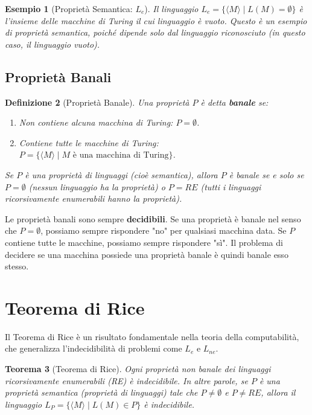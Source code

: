 \documentclass[a4paper, 11pt]{book} %
\newtheorem{theorem}{Teorema}[section]
\newtheorem{definition}[theorem]{Definizione}
\newtheorem{example}[theorem]{Esempio}
\theoremstyle{definition}
\begin{document}
\begin{example}[Proprietà Semantica: $L_e$]
Il linguaggio $L_e = \{\langle M \rangle \mid L(M) = \emptyset\}$ è l'insieme delle macchine di Turing il cui linguaggio è vuoto. Questo è un esempio di proprietà semantica, poiché dipende solo dal linguaggio riconosciuto (in questo caso, il linguaggio vuoto).
\end{example}

\subsection{Proprietà Banali}

\begin{definition}[Proprietà Banale]
Una proprietà $P$ è detta \textbf{banale} se:
\begin{enumerate}
    \item Non contiene alcuna macchina di Turing: $P = \emptyset$.
    \item Contiene tutte le macchine di Turing: $P = \{\langle M \rangle \mid M \text{ è una macchina di Turing}\}$.
\end{enumerate}
Se $P$ è una proprietà di linguaggi (cioè semantica), allora $P$ è banale se e solo se $P = \emptyset$ (nessun linguaggio ha la proprietà) o $P = RE$ (tutti i linguaggi ricorsivamente enumerabili hanno la proprietà).
\end{definition}

Le proprietà banali sono sempre \textbf{decidibili}. Se una proprietà è banale nel senso che $P = \emptyset$, possiamo sempre rispondere "no" per qualsiasi macchina data. Se $P$ contiene tutte le macchine, possiamo sempre rispondere "sì". Il problema di decidere se una macchina possiede una proprietà banale è quindi banale esso stesso.

\section{Teorema di Rice}

Il Teorema di Rice è un risultato fondamentale nella teoria della computabilità, che generalizza l'indecidibilità di problemi come $L_e$ e $L_{ne}$.

\begin{theorem}[Teorema di Rice]
Ogni proprietà non banale dei linguaggi ricorsivamente enumerabili (RE) è indecidibile.
In altre parole, se $P$ è una proprietà semantica (proprietà di linguaggi) tale che $P \neq \emptyset$ e $P \neq RE$, allora il linguaggio $L_P = \{\langle M \rangle \mid L(M) \in P\}$ è indecidibile.
\end{theorem}
\end{document}
